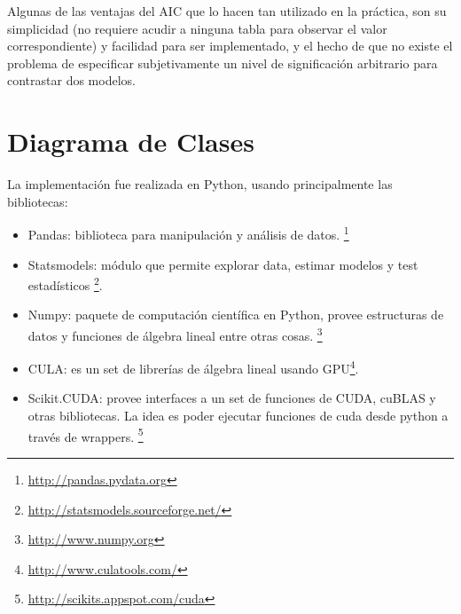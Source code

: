 Algunas de las ventajas del AIC que lo hacen tan utilizado en la práctica, son
su simplicidad (no requiere acudir a ninguna tabla para observar el valor
correspondiente) y facilidad para ser implementado, y el hecho de que no existe
el problema de especificar subjetivamente un nivel de significación arbitrario
para contrastar dos modelos.

\section{Diagrama de Clases}
La implementación fue realizada en Python, usando principalmente las bibliotecas:
\begin{itemize}
 \item Pandas: biblioteca para manipulación y análisis de datos.
\footnote{\url{http://pandas.pydata.org}}
 \item Statsmodels: módulo que permite explorar data, estimar modelos y test
estadísticos \footnote{\url{http://statsmodels.sourceforge.net/}}.
 \item Numpy: paquete de computación científica en Python, provee estructuras
de datos y funciones de álgebra lineal entre otras cosas.
\footnote{\url{http://www.numpy.org}}
 \item CULA: es un set de librerías de álgebra lineal usando
GPU\footnote{\url{http://www.culatools.com/}}.
 \item Scikit.CUDA: provee interfaces a un set de funciones de CUDA, cuBLAS y
otras bibliotecas. La idea es poder ejecutar funciones de cuda desde python a
través de wrappers. \footnote{\url{http://scikits.appspot.com/cuda}}
\end{itemize}

